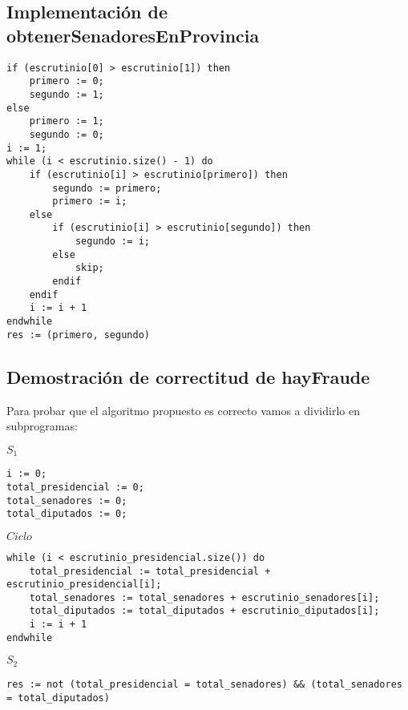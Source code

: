 \documentclass[10pt,a4paper]{article}
\begin{document}
\subsection{Implementación de obtenerSenadoresEnProvincia}

	\begin{lstlisting}[caption={},label=code:for]
if (escrutinio[0] > escrutinio[1]) then
	primero := 0;
	segundo := 1;
else
	primero := 1;
	segundo := 0;
i := 1;
while (i < escrutinio.size() - 1) do
	if (escrutinio[i] > escrutinio[primero]) then
		segundo := primero;
		primero := i;
	else
		if (escrutinio[i] > escrutinio[segundo]) then
			segundo := i;
		else
			skip;
		endif
	endif
	i := i + 1
endwhile
res := (primero, segundo)
	\end{lstlisting}


\subsection{Demostración de correctitud de hayFraude}



Para probar que el algoritmo propuesto es correcto vamos a dividirlo en subprogramas:

\vspace{0.3cm}

$S_1$
	\begin{lstlisting}[caption={},label=code:for]
i := 0;
total_presidencial := 0;
total_senadores := 0;
total_diputados := 0;
	\end{lstlisting}

\vspace{0.3cm}

$Ciclo$
	\begin{lstlisting}[caption={},label=code:for]
while (i < escrutinio_presidencial.size()) do
	total_presidencial := total_presidencial + escrutinio_presidencial[i];
	total_senadores := total_senadores + escrutinio_senadores[i];
	total_diputados := total_diputados + escrutinio_diputados[i];
	i := i + 1
endwhile
	\end{lstlisting}

\vspace{0.3cm}

$S_2$


	\begin{lstlisting}[caption={},label=code:for]
res := not (total_presidencial = total_senadores) && (total_senadores = total_diputados)
	\end{lstlisting}

\vspace{0.3cm}
\end{document}
